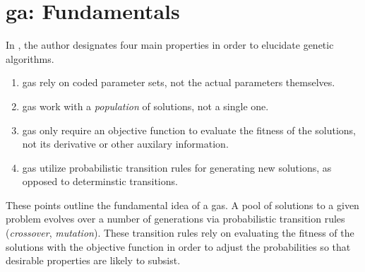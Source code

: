 \section{\gls{ga}: Fundamentals}\label{sec:ga_fundamental}
In \citep[p. 7]{goldberg89}, the author designates four main properties in order to elucidate genetic algorithms. 
\begin{enumerate}
\item \gls{ga}s rely on coded parameter sets, not the actual parameters themselves.
\item \gls{ga}s work with a \textit{population} of solutions, not a single one.
\item \gls{ga}s only require an objective function to evaluate the fitness of the solutions, not its derivative or other auxilary information.
\item \gls{ga}s utilize probabilistic transition rules for generating new solutions, as opposed to determinstic transitions.
\end{enumerate}
These points outline the fundamental idea of a \gls{ga}s. A pool of solutions to a given problem evolves over a number of generations via probabilistic transition rules (\textit{crossover}, \textit{mutation}).
These transition rules rely on evaluating the fitness of the solutions with the objective function in order to adjust the probabilities so that desirable properties are likely to subsist.
\citep{genetic_survey}

